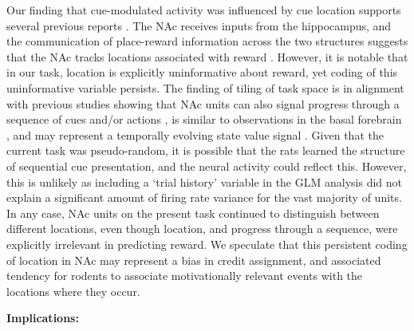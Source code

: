\documentclass[11pt]{article}
\let\cite=\citep
\begin{document}
Our finding that cue-modulated activity was influenced by cue location supports several previous reports \cite{Lavoie1994,Wiener2003,Mulder2005,Strait2016}. The NAc receives inputs from the hippocampus, and the communication of place-reward information across the two structures suggests that the NAc tracks locations associated with reward \cite{Tabuchi2000,Pennartz2004,Lansink2008,Lansink2009,VanderMeer2011,Lansink2016,Sjulson2017}. However, it is notable that in our task, location is explicitly uninformative about reward, yet coding of this uninformative variable persists. The finding of tiling of task space is in alignment with previous studies showing that NAc units can also signal progress through a sequence of cues and/or actions \cite{Shidara1998,Mulder2004,Khamassi2008,Berke2009,Lansink2012,Atallah2014}, is similar to observations in the basal forebrain \cite{Tingley2018}, and may represent a temporally evolving state value signal \cite{Pennartz2011,Hamid2016}. Given that the current task was pseudo-random, it is possible that the rats learned the structure of sequential cue presentation, and the neural activity could reflect this. However, this is unlikely as including a ‘trial history’ variable in the GLM analysis did not explain a significant amount of firing rate variance for the vast majority of units. In any case, NAc units on the present task continued to distinguish between different locations, even though location, and progress through a sequence, were explicitly irrelevant in predicting reward. We speculate that this persistent coding of location in NAc may represent a bias in credit assignment, and associated tendency for rodents to associate motivationally relevant events with the locations where they occur.

{\bf Implications:}
\end{document}
